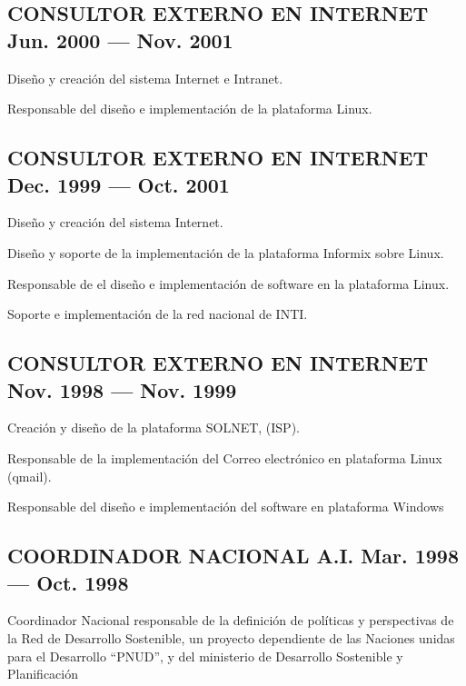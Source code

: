 \documentclass[letter,10pt]{article}
\begin{document}
\subsection{{CONSULTOR EXTERNO EN INTERNET \hfill Jun. 2000 --- Nov. 2001}}
\begin{zitemize}
\item	Diseño y creación del sistema Internet e Intranet.
\item	Responsable del diseño e implementación de la plataforma Linux.	
\end{zitemize}
\vspace*{2mm}
\subsection{{CONSULTOR EXTERNO EN INTERNET \hfill Dec. 1999 --- Oct. 2001}}
\begin{zitemize}
\item	Diseño y creación del sistema Internet.
\item	Diseño y soporte de la implementación de la plataforma Informix sobre Linux.
\item	Responsable de el diseño e implementación de software en la plataforma Linux.
\item	Soporte e implementación de la red nacional de INTI.
\end{zitemize}
\vspace*{2mm}
\subsection{{CONSULTOR EXTERNO EN INTERNET \hfill Nov. 1998 --- Nov. 1999}}
\begin{zitemize}
\item Creación y diseño de la plataforma SOLNET, (ISP).
\item Responsable de la implementación del Correo electrónico en plataforma Linux (qmail).
\item Responsable del diseño e implementación del software en plataforma Windows
\end{zitemize}
\vspace*{2mm}
\subsection{{COORDINADOR NACIONAL A.I. \hfill Mar. 1998 --- Oct. 1998}}
\begin{zitemize}
\item Coordinador Nacional responsable de la definición de políticas y perspectivas de la Red de Desarrollo Sostenible, un proyecto dependiente de las Naciones unidas para el Desarrollo ``PNUD'', y del ministerio de Desarrollo Sostenible y Planificación
\end{zitemize}
\vspace*{2mm}
\end{document}
